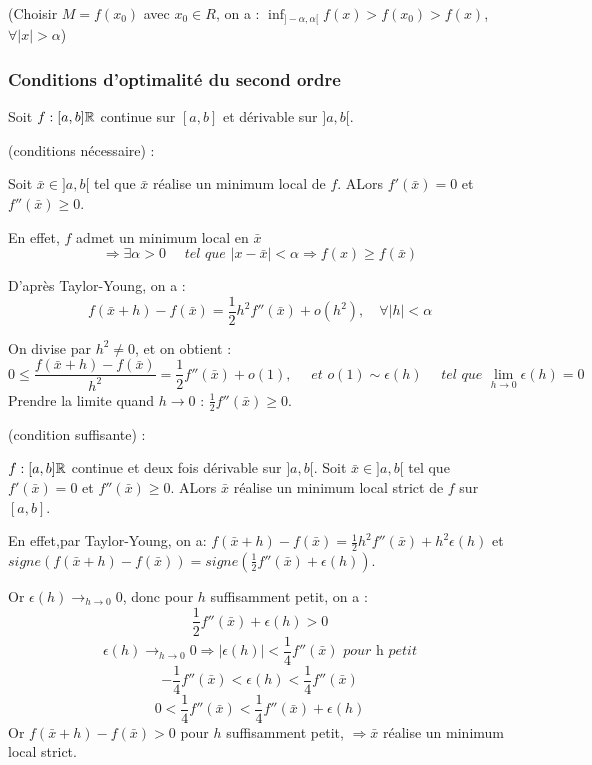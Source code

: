 		(Choisir $M = f(x_0)$ avec $x_0 \in R$, on a : $\inf_{]-\alpha, \alpha[} f(x) > f(x_0) > f(x)$, $\forall |x| > \alpha$)
		
		\subsubsection{Conditions d'optimalité du second ordre}
		
		Soit $f : [a, b] \mathbb{R}$ continue sur $[a, b]$ et dérivable sur $]a, b[$.
		
		\begin{theoreme} (conditions nécessaire) : 
		
		Soit $\bar{x} \in ]a, b[$ tel que $\bar{x}$ réalise un minimum local de $f$. ALors $f'(\bar{x}) = 0$ et $f''(\bar{x}) \geq 0$.
		\end{theoreme}
		
		En effet, $f$ admet un minimum local en $\bar{x}$ \[\Rightarrow \exists \alpha >0 \quad\textit{ tel que }|x-\bar{x}|<\alpha \Rightarrow f(x) \geq f(\bar{x})\]
		
		D'après Taylor-Young, on a : \[ f(\bar{x}+h) -f(\bar{x}) = \frac{1}{2} h^2 f''(\bar{x}) + o(h^2), \quad\forall |h|<\alpha\]
		
		On divise par $h^2 \ne 0$, et on obtient : \[ 0 \leq \frac{f(\bar{x}+h) - f(\bar{x}) }{ h^2 } = \frac{1}{2} f''(\bar{x}) + o(1),\quad\textit{ et }o(1) \sim \epsilon(h)\quad\textit{ tel que }\lim_{h \rightarrow 0} \epsilon(h) = 0\]
		Prendre la limite quand $h\rightarrow 0$ : $\frac{1}{2} f''(\bar{x}) \geq 0$.
		
		\begin{theoreme} (condition suffisante) :
		
		$f : [a, b] \mathbb{R}$ continue et deux fois dérivable sur $]a, b[$. Soit $\bar{x} \in ]a, b[$ tel que $f'(\bar{x}) = 0$ et $f''(\bar{x}) \geq 0$. ALors $\bar{x}$ réalise un minimum local strict de $f$ sur $[a, b]$.
		\end{theoreme}
		
		En effet,par Taylor-Young, on a: $f(\bar{x}+h) -f(\bar{x}) = \frac{1}{2} h^2 f''(\bar{x}) + h^2 \epsilon(h)$ et $signe( f(\bar{x}+h) - f(\bar{x}) ) = signe( \frac{1}{2} f''(\bar{x}) + \epsilon(h))$.
		
		Or $\displaystyle \epsilon(h) \longrightarrow_{h\rightarrow 0} 0$, donc pour $h$ suffisamment petit, on a : 
		\[ \frac{1}{2} f''(\bar{x}) + \epsilon(h) >0\]
		\[ \epsilon(h) \longrightarrow_{h\rightarrow 0} 0 \Rightarrow |\epsilon(h)| < \frac{1}{4} f''(\bar{x}) \textit{ pour h petit}\]
		\[-\frac{1}{4} f''(\bar{x}) < \epsilon(h) < \frac{1}{4} f''(\bar{x})\]
		\[0< \frac{1}{4} f''(\bar{x}) < \frac{1}{4} f''(\bar{x}) + \epsilon(h) \]
		Or $f(\bar{x}+h) - f(\bar{x}) >0$ pour $h$ suffisamment petit, $ \Rightarrow \bar{x}$ réalise un minimum local strict.
		
